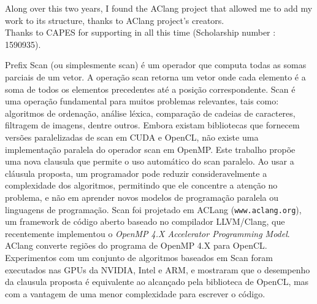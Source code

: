 \documentclass[Ingles]{ic-tese-v1}
\newcommand{\tit}[1]{{\textit{#1}}}
\begin{document}
Along over this two years, I found the AClang project that allowed me to add my work to its structure, thanks to AClang project's creators.\\
Thanks to CAPES for supporting in all this time (Scholarship number : 1590935).


\begin{resumo}
Prefix Scan (ou simplesmente scan) é um operador que computa todas as somas
parciais de um vetor. A operação scan retorna um vetor onde cada elemento é a
soma de todos os elementos precedentes até a posição correspondente. Scan é uma
operação fundamental para muitos problemas relevantes, tais como: algoritmos de
ordenação, análise léxica, comparação de cadeias de caracteres, filtragem de
imagens, dentre outros. Embora existam bibliotecas que fornecem versões
paralelizadas de scan em CUDA e OpenCL, não existe uma implementação paralela
do operador scan em OpenMP. Este trabalho propõe uma nova clausula que permite
o uso automático do scan paralelo. Ao usar a cláusula proposta, um programador
pode reduzir consideravelmente a complexidade dos algoritmos, permitindo que
ele concentre a atenção no problema, e não em aprender novos modelos de
programação paralela ou linguagens de programação. Scan foi projetado em ACLang
(\texttt{www.aclang.org}), um framework de código aberto baseado no compilador
LLVM/Clang, que recentemente implementou o \tit{OpenMP 4.X Accelerator Programming
Model}. AClang converte regiões do programa de OpenMP 4.X para OpenCL.
Experimentos com um conjunto de algoritmos baseados em Scan foram executados
nas GPUs da NVIDIA, Intel e ARM, e mostraram que o desempenho da
clausula proposta  é equivalente ao alcançado pela biblioteca de OpenCL, mas com a
vantagem de uma menor complexidade para escrever o código.
\end{resumo}
\end{document}
